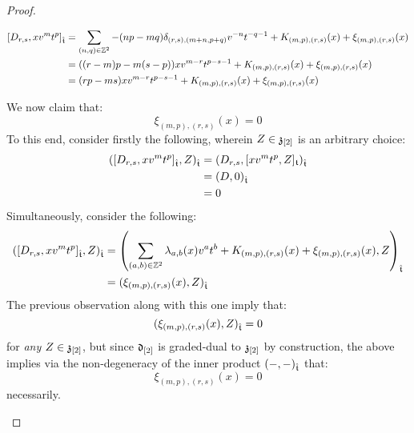 \begin{proof}
\begin{enumerate}
$$\begin{aligned}
                                [D_{r, s}, x v^m t^p]_{\extendedtoroidal} & = \sum_{(n, q) \in \Z^2} -(np - mq) \delta_{(r, s), (m + n, p + q)} v^{-n} t^{-q - 1} + K_{(m, p), (r, s)}(x) + \xi_{(m, p), (r, s)}(x)
                                \\
                                & = ( (r - m)p - m(s - p) ) x v^{m - r} t^{p - s - 1} + K_{(m, p), (r, s)}(x) + \xi_{(m, p), (r, s)}(x)
                                \\
                                & = ( rp - ms ) x v^{m - r} t^{p - s - 1} + K_{(m, p), (r, s)}(x) + \xi_{(m, p), (r, s)}(x)
                            \end{aligned}
                        $$
                        
                    We now claim that:
                        $$\xi_{(m, p), (r, s)}(x) = 0$$
                    To this end, consider firstly the following, wherein $Z \in \mathfrak{z}_{[2]}$ is an arbitrary choice:
                        $$
                            \begin{aligned}
                                ( [D_{r, s}, x v^m t^p]_{\hat{\mathfrak{t}}}, Z )_{\hat{\mathfrak{t}}} & = ( D_{r, s}, [x v^m t^p, Z]_{\mathfrak{t}} )_{\hat{\mathfrak{t}}}
                                \\
                                & = (D, 0)_{\hat{\mathfrak{t}}}
                                \\
                                & = 0
                            \end{aligned}
                        $$
                    Simultaneously, consider the following:
                        $$
                            \begin{aligned}
                                ( [D_{r, s}, x v^m t^p]_{\hat{\mathfrak{t}}}, Z )_{\hat{\mathfrak{t}}} & = \left( \sum_{(a, b) \in \mathbb{Z}^2} \lambda_{a, b}(x) v^a t^b + K_{(m, p), (r, s)}(x) + \xi_{(m, p), (r, s)}(x), Z \right)_{\hat{\mathfrak{t}}}
                                \\
                                & = ( \xi_{(m, p), (r, s)}(x), Z )_{\hat{\mathfrak{t}}}
                            \end{aligned}
                        $$
                    The previous observation along with this one imply that:
                        $$( \xi_{(m, p), (r, s)}(x), Z )_{\hat{\mathfrak{t}}} = 0$$
                    for \textit{any} $Z \in \mathfrak{z}_{[2]}$, but since $\mathfrak{d}_{[2]}$ is graded-dual to $\mathfrak{z}_{[2]}$ by construction, the above implies via the non-degeneracy of the inner product $(-, -)_{\hat{\mathfrak{t}}}$ that:
                        $$\xi_{(m, p), (r, s)}(x) = 0$$
                    necessarily. 
    

\end{enumerate}
\end{proof}
